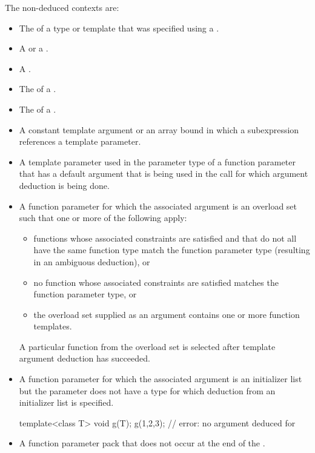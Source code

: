 \pnum
The non-deduced contexts are:

%
\begin{itemize}
\item
The
of a type or template that was specified using a
.
\item
A  or a .
\item
A .
\item
The  of a .
\item
The  of a .
\item
A constant template argument or an array bound in which a subexpression
references a template parameter.
\item
A template parameter used in the parameter type of a function parameter that
has a default argument that is being used in the call for which argument
deduction is being done.
\item
A function parameter for which the associated argument is an
overload set such that one or more of the following apply:
\begin{itemize}
\item
functions whose associated constraints are satisfied and
that do not all have the same function type
match the function parameter type (resulting in an ambiguous deduction), or
\item
no function whose associated constraints are satisfied
matches the function parameter type, or
\item
the overload set supplied as an argument contains one or more function templates.
\end{itemize}
\begin{tailnote}
A particular function from the overload set is selected
after template argument deduction has succeeded.
\end{tailnote}
\item A function parameter for which the associated argument is an initializer
list but the parameter does not have
a type for which deduction from an initializer list is specified.
\begin{example}
\begin{codeblock}
template<class T> void g(T);
g({1,2,3});                 // error: no argument deduced for 
\end{codeblock}
\end{example}
\item A function parameter pack that does not occur at the end of the
.
\end{itemize}

